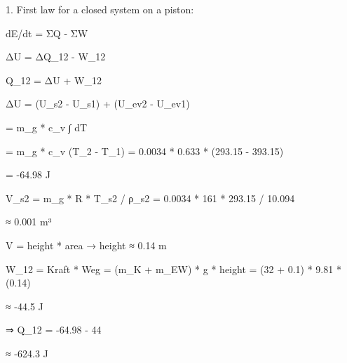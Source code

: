 1. First law for a closed system on a piston:  

dE/dt = ΣQ - ΣW  

ΔU = ΔQ_12 - W_12  

Q_12 = ΔU + W_12  

ΔU = (U_s2 - U_s1) + (U_ev2 - U_ev1)  

= m_g * c_v ∫ dT  

= m_g * c_v (T_2 - T_1) = 0.0034 * 0.633 * (293.15 - 393.15)  

= -64.98 J  

V_s2 = m_g * R * T_s2 / ρ_s2 = 0.0034 * 161 * 293.15 / 10.094  

≈ 0.001 m³  

V = height * area → height ≈ 0.14 m  

W_12 = Kraft * Weg = (m_K + m_EW) * g * height = (32 + 0.1) * 9.81 * (0.14)  

≈ -44.5 J  

⇒ Q_12 = -64.98 - 44  

≈ -624.3 J